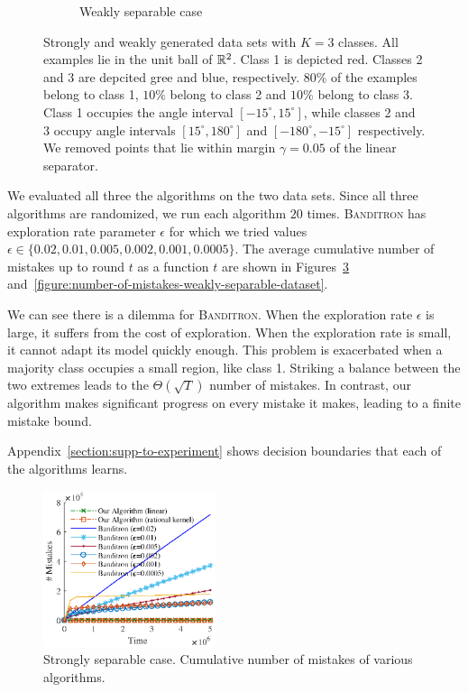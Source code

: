 \begin{figure}[h]
\begin{subfigure}[b]{0.23\textwidth}
\caption{Weakly separable case}
\label{figure:weakly-separable-dataset}
\end{subfigure}
\vspace*{-0.2cm}
\caption{Strongly and weakly generated data sets with $K=3$ classes. All
examples lie in the unit ball of $\mathbb{R}^2$. Class 1 is depicted red. Classes 2 and
3 are depcited gree and blue, respectively. $80\%$ of the examples belong to class 1,
$10\%$ belong to class 2 and $10\%$ belong to class 3. Class 1
occupies the angle interval $[-15^\circ, 15^\circ]$, while classes 2 and 3
occupy angle intervals $[15^\circ, 180^\circ]$ and $[-180^\circ, -15^\circ]$
respectively. We removed points that lie within margin $\gamma=0.05$ of the
linear separator.}
\label{figure:strongly-and-weakly-separable-datasets}
\end{figure}

We evaluated all three the algorithms on the two data sets. Since all three
algorithms are randomized, we run each algorithm $20$ times. \textsc{Banditron}
has exploration rate parameter $\epsilon$ for which we tried values $\epsilon
\in \{0.02, 0.01, 0.005, 0.002, 0.001, 0.0005 \}$. The average cumulative number
of mistakes up to round $t$ as a function $t$ are shown in
Figures~\ref{figure:number-of-mistakes-strongly-separable-dataset}
and~\ref{figure:number-of-mistakes-weakly-separable-dataset}.

We can see there is a dilemma for \textsc{Banditron}. When the
exploration rate $\epsilon$ is large, it suffers from the cost of exploration.
When the exploration rate is small, it cannot adapt its model quickly enough.
This problem is exacerbated when a majority class occupies a small region, like
class 1. Striking a balance between the two extremes leads to the
$\Theta(\sqrt{T})$ number of mistakes. In contrast, our algorithm makes
significant progress on every mistake it makes, leading to a finite mistake
bound.

Appendix~\ref{section:supp-to-experiment} shows decision boundaries
that each of the algorithms learns.

\begin{figure}
\centering
\includegraphics[width=0.45\textwidth]{figures/strong3}
\caption{Strongly separable case. Cumulative number of mistakes of various algorithms.}
\label{figure:number-of-mistakes-strongly-separable-dataset}
\end{figure}


